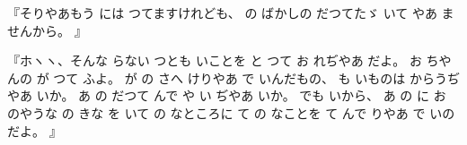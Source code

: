 『そりやあもう
には
つてますけれども、
の
ばかしの
だつてたゞ
いて
やあ
ませんから。
』

『ホヽヽ、そんな
らない
つとも
いことを
と
つて
お
れぢやあ
だよ。
お
ちやんの
が
つて
ふよ。
が
の
さへ
けりやあ
で
いんだもの、
も
いものは
からうぢやあ
いか。
あ
の
だつて
んで
や
い
ぢやあ
いか。
でも
いから、
あ
の
に
お
のやうな
の
きな
を
いて
の
なところに
て
の
なことを
て
んで
りやあ
で
いのだよ。
』

